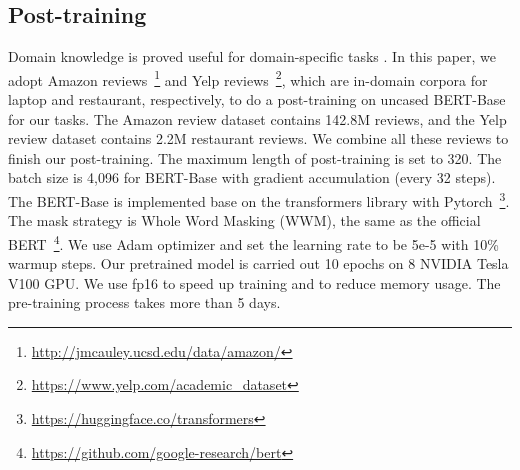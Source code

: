 \documentclass[11pt,a4paper]{article}
\begin{document}
\subsection{Post-training}
Domain knowledge is proved useful for domain-specific tasks \cite{Xu2019,Luo2019}. In this paper, we adopt Amazon reviews~\footnote{\url{http://jmcauley.ucsd.edu/data/amazon/}} and Yelp reviews~\footnote{\url{https://www.yelp.com/academic_dataset}}, which are in-domain corpora for laptop and restaurant, respectively, to do a post-training on uncased BERT-Base for our tasks. The Amazon review dataset contains 142.8M reviews, and the Yelp review dataset contains 2.2M restaurant reviews. We combine all these reviews to finish our post-training. The maximum length of post-training is set to 320. The batch size is 4,096 for BERT-Base with gradient accumulation (every 32 steps). The BERT-Base is implemented base on the transformers library with Pytorch~\footnote{\url{https://huggingface.co/transformers}}. The mask strategy is Whole Word Masking (WWM), the same as the official BERT~\footnote{\url{https://github.com/google-research/bert}}. We use Adam optimizer and set the learning rate to be 5e-5 with 10\% warmup steps. Our pretrained model is carried out 10 epochs on 8 NVIDIA Tesla V100 GPU. We use fp16 to speed up training and to reduce memory usage. The pre-training process takes more than 5 days.
\end{document}
